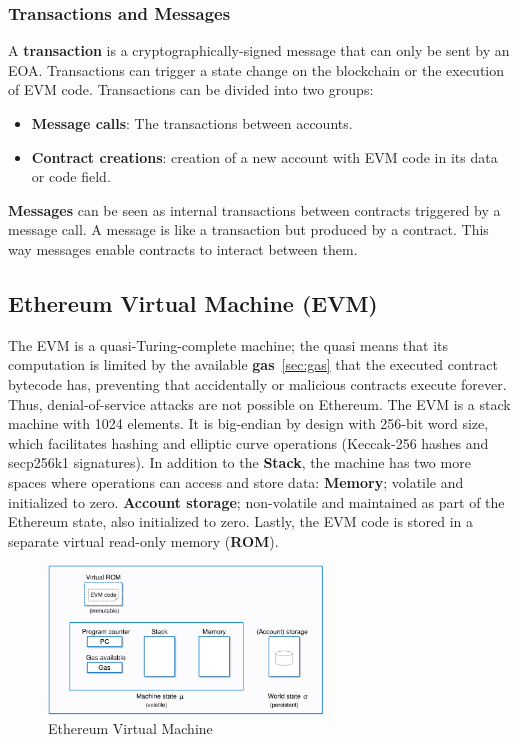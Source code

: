 \documentclass[11pt,a4paper]{report}
\begin{document}
\subsubsection{Transactions and Messages}
A \textbf{transaction} is a cryptographically-signed message that can only be sent by an EOA. Transactions can trigger a state change on the blockchain or the execution of EVM code. Transactions can be divided into two groups:
\begin{itemize}
	\item  \textbf{Message calls}: The transactions between accounts.
	\item \textbf{Contract creations}: creation of a new account with EVM code in its data or code field.
\end{itemize}
\textbf{Messages} can be seen as internal transactions between contracts triggered by a message call. A message is like a transaction but produced by a contract. This way messages enable contracts to interact between them.
\subsection{Ethereum Virtual Machine (EVM)}\label{sec:evm}
The EVM\cite{wood2014ethereum}\cite{book:masteringETH-evm} is a quasi-Turing-complete machine; the quasi means that its computation is limited by the available \textbf{gas}~\ref{sec:gas} that the executed contract bytecode has, preventing that accidentally or malicious contracts execute forever. Thus, denial-of-service attacks are not possible on Ethereum. The EVM is a stack machine with 1024 elements. It is big-endian by design with 256-bit word size, which facilitates hashing and elliptic curve operations (Keccak-256 hashes and secp256k1 signatures). In addition to the {\textbf{Stack}}, the machine has two more  spaces where operations can access and store data: {\textbf{Memory}}; volatile and initialized to zero. \textbf{Account storage}; non-volatile and maintained as part of the Ethereum state, also initialized to zero. Lastly, the EVM code is stored in a separate virtual read-only memory (\textbf{ROM}).
\begin{figure}[htp]
	\centering
	\includegraphics[width=0.65\textwidth]{./images/evm}
	\caption{Ethereum Virtual Machine\cite{evm-illustrate}}
	\label{fig:accounts}
\end{figure}
\end{document}
